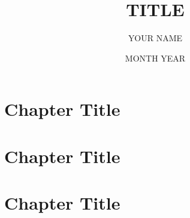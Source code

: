 \documentclass{BGSU}
\title{TITLE}
\author{YOUR NAME}
\date{MONTH YEAR}
\begin{document}
\frontmatter

\maketitle 

\begin{abstract}

\end{abstract}

\begin{dedication}

\end{dedication}

\begin{acknowledgments}

\end{acknowledgments}

\tableofcontents

\listoffigures

\listoftables

\mainmatter %

\chapter{Chapter Title}


\chapter{Chapter Title}


\chapter{Chapter Title}


\backmatter

 



\appendix
\end{document}
